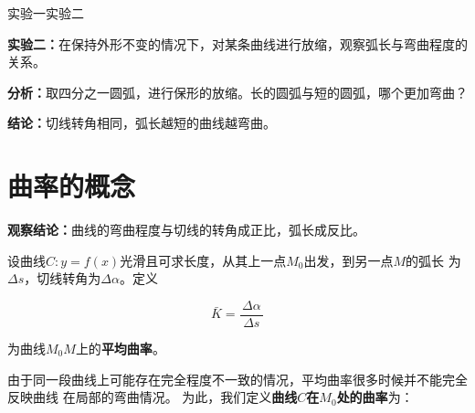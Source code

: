 \documentclass[a4paper]{article}
\newcommand*{\df}[2]{\displaystyle\frac{\,{#1}\,}{\,{#2}\,}}
\begin{document}
\begin{center}
	\vspace{-2em}
	实验一\hspace{6cm}实验二
\end{center}

{\bf 实验二：}在保持外形不变的情况下，对某条曲线进行放缩，观察弧长与弯曲程度的关系。

{\bf 分析：}取四分之一圆弧，进行保形的放缩。长的圆弧与短的圆弧，哪个更加弯曲？

{\bf 结论：}切线转角相同，弧长越短的曲线越弯曲。

\section{曲率的概念}

{\bf 观察结论：}曲线的弯曲程度与切线的转角成正比，弧长成反比。

设曲线$C:y=f(x)$光滑且可求长度，从其上一点$M_0$出发，到另一点$M$的弧长
为$\Delta s$，切线转角为$\Delta\alpha$。定义

$$\bar{K}=\df{\Delta\alpha}{\Delta s}$$

为曲线$M_0M$上的{\bf 平均曲率}。

\begin{center}
\end{center}

由于同一段曲线上可能存在完全程度不一致的情况，平均曲率很多时候并不能完全反映曲线
在局部的弯曲情况。
为此，我们定义{\bf 曲线$C$在$M_0$处的曲率}为：
\end{document}
